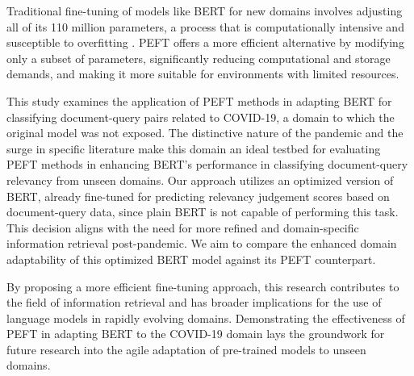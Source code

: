 \documentclass[sigconf, natbib=true]{acmart}
\begin{document}
Traditional fine-tuning of models like BERT for new domains involves adjusting all of its 110 million parameters, a process that is computationally intensive and susceptible to overfitting \cite{bejani2021systematic}. PEFT offers a more efficient alternative by modifying only a subset of parameters, significantly reducing computational and storage demands, and making it more suitable for environments with limited resources.

This study examines the application of PEFT methods in adapting BERT for classifying document-query pairs related to COVID-19, a domain to which the original model was not exposed. 
The distinctive nature of the pandemic and the surge in specific literature make this domain an ideal testbed for evaluating PEFT methods in enhancing BERT's performance in classifying document-query relevancy from unseen domains. 
Our approach utilizes an optimized version of BERT, already fine-tuned for predicting relevancy judgement scores based on document-query data, since plain BERT is not capable of performing this task. 
This decision aligns with the need for more refined and domain-specific information retrieval post-pandemic. 
We aim to compare the enhanced domain adaptability of this optimized BERT model against its PEFT counterpart.

By proposing a more efficient fine-tuning approach, this research contributes to the field of information retrieval and has broader implications for the use of language models in rapidly evolving domains. Demonstrating the effectiveness of PEFT in adapting BERT to the COVID-19 domain lays the groundwork for future research into the agile adaptation of pre-trained models to unseen domains.
\end{document}
